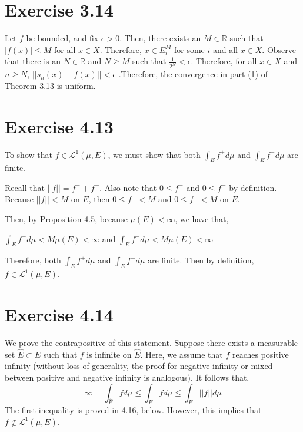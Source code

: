 \documentclass{article}
\begin{document}
    \section*{Exercise 3.14}

     Let $f$ be bounded, and fix $\epsilon > 0$. Then, there exists an $M \in \mathbb{R}$ such that $|f(x)| \leq M$ for all $x \in X$. Therefore, $x \in E^M_i$ for some $i$ and all $x \in X$. Observe that there is an $N \in \mathbb{R}$ and $N \geq M$ such that $\frac{1}{2^N} < \epsilon$. Therefore, for all $x \in X$ and $n \geq N$, $|| s_n(x) - f(x) || < \epsilon$
    .Therefore, the convergence in part (1) of Theorem 3.13 is uniform.


    \section*{Exercise 4.13}
    To show that $f \in \mathscr{L}^{1}(\mu, E)$, we must show that both $\int_E f^+ d \mu$ and $\int_E f^- d \mu$ are finite.

    Recall that $||f|| = f^+ + f^-$. Also note that $0 \leq f^+$ and $0 \leq f^-$ by definition. Because $||f|| < M$ on $E$, then $0 \leq f^+ < M$ and $0 \leq f^- < M$ on $E$.

    Then, by Proposition 4.5, because $\mu(E) < \infty$, we have that,

      $\int_E f^+ d\mu < M \mu(E) < \infty$ and $
      \int_E f^- d\mu < M \mu(E) < \infty$

      Therefore, both $\int_E f^+ d\mu$ and $\int_E f^- d\mu$ are finite. Then by definition, $f \in \mathscr{L}^1(\mu, E)$.

      \section*{Exercise 4.14}
  We prove the contrapositive of this statement. Suppose there exists a measurable set $\hat{E} \subset E$ such that $f$ is infinite on $\hat{E}$. Here, we assume that $f$ reaches positive infinity (without loss of generality, the proof for negative infinity or mixed between positive and negative infinity is analogous). It follows that,
  \begin{equation}
  	\infty = \int_{\hat{E}} f d\mu \leq \int_E f d\mu \leq \int_E ||f|| d\mu
  \end{equation}
  The first inequality is proved in 4.16, below. However, this implies that $f \not\in \mathscr{L}^1(\mu,E)$.
\end{document}
